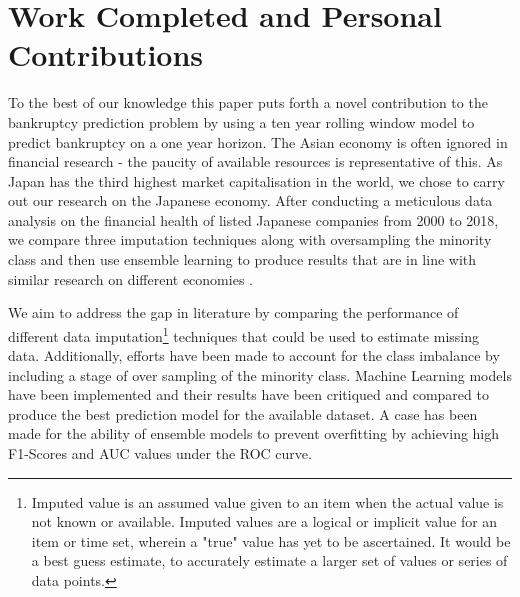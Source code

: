 \section{Work Completed and Personal Contributions}


To the best of our knowledge this paper puts forth a novel contribution to the bankruptcy prediction problem by using a ten year rolling window model to predict bankruptcy on a one year horizon. The Asian economy is often ignored in financial research - the paucity of available resources is representative of this. As Japan has the third highest market capitalisation in the world, we chose to carry out our research on the Japanese economy.
After conducting a meticulous data analysis on the financial health of listed Japanese companies from 2000 to 2018, we compare three imputation techniques along with oversampling the minority class and then use ensemble learning to produce results that are in line with similar research on different economies \cite{barboza2017machine,le2018cluster}.

We aim to address the gap in literature by comparing the performance of different data imputation\footnote{Imputed value is an assumed value given to an item when the actual value is not known or available. Imputed values are a logical or implicit value for an item or time set, wherein a "true" value has yet to be ascertained. It would be a best guess estimate, to accurately estimate a larger set of values or series of data points.} techniques that could be used to estimate missing data. Additionally, efforts have been made to account for the class imbalance by including a stage of over sampling of the minority class.
Machine Learning models have been implemented and their results have been critiqued and compared to produce the best prediction model for the available dataset. A case has been made for the ability of ensemble models to prevent overfitting by achieving high F1-Scores and AUC values under the ROC curve.



